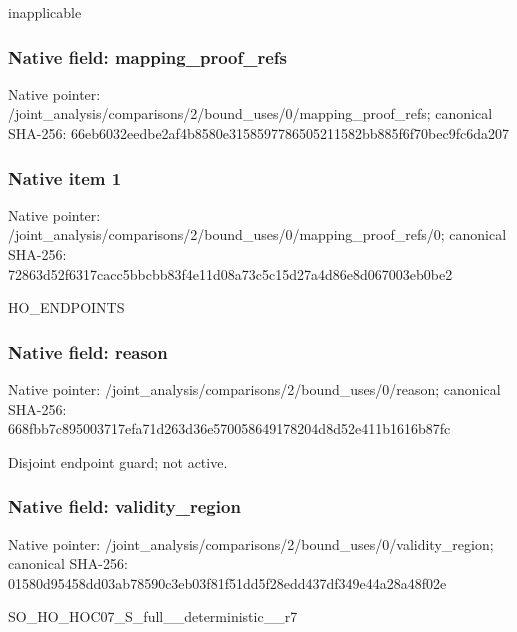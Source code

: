 \documentclass[10pt,a4paper]{article}
\begin{document}
\begingroup\raggedright\sloppy inapplicable\par\endgroup

\subsubsection{Native field: mapping\_\allowbreak{}proof\_\allowbreak{}refs}
Native pointer: /joint\_\allowbreak{}analysis/comparisons/2/bound\_\allowbreak{}uses/0/mapping\_\allowbreak{}proof\_\allowbreak{}refs; canonical SHA-256: 66eb6032eedbe2af4b8580e3158597786505211582bb885f6f70bec9fc6da207

\subsubsection{Native item 1}
Native pointer: /joint\_\allowbreak{}analysis/comparisons/2/bound\_\allowbreak{}uses/0/mapping\_\allowbreak{}proof\_\allowbreak{}refs/0; canonical SHA-256: 72863d52f6317cacc5bbcbb83f4e11d08a73c5c15d27a4d86e8d067003eb0be2

\begingroup\raggedright\sloppy HO\_\allowbreak{}ENDPOINTS\par\endgroup

\subsubsection{Native field: reason}
Native pointer: /joint\_\allowbreak{}analysis/comparisons/2/bound\_\allowbreak{}uses/0/reason; canonical SHA-256: 668fbb7c895003717efa71d263d36e570058649178204d8d52e411b1616b87fc

\begingroup\raggedright\sloppy Disjoint endpoint guard;\allowbreak{} not active.\par\endgroup

\subsubsection{Native field: validity\_\allowbreak{}region}
Native pointer: /joint\_\allowbreak{}analysis/comparisons/2/bound\_\allowbreak{}uses/0/validity\_\allowbreak{}region; canonical SHA-256: 01580d95458dd03ab78590c3eb03f81f51dd5f28edd437df349e44a28a48f02e

\begingroup\raggedright\sloppy SO\_\allowbreak{}HO\_\allowbreak{}HOC07\_\allowbreak{}S\_\allowbreak{}full\_\allowbreak{}\_\allowbreak{}deterministic\_\allowbreak{}\_\allowbreak{}r7\par\endgroup
\end{document}
